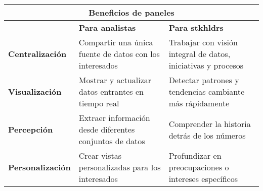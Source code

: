 \begin{table}
    \centering
    \begin{tabular}{|p{2.9cm}|p{5.4cm}|p{5.5cm}|}
        \hline
        \multicolumn{3}{|c|}{Beneficios de paneles} \\
        \hline
        & \textbf{Para analistas} & \textbf{Para \Gls{stkhldrs}} \\
        \hline
        \small{\textbf{Centralización}} & Compartir una única fuente de datos con los interesados & Trabajar con visión integral de datos, iniciativas y procesos \\
        \hline
        \small{\textbf{Visualización}} & Mostrar y actualizar datos \break entrantes en tiempo real & Detectar patrones y tendencias cambiante más rápidamente \\
        \hline
         \small{\textbf{Percepción}} & Extraer información desde \break diferentes conjuntos de datos & Comprender la historia detrás de los números \\
        \hline
        \small{\textbf{Personalización}} & Crear vistas personalizadas para los interesados & Profundizar en preocupaciones o intereses específicos \\
        \hline
    \end{tabular}
\end{table}

